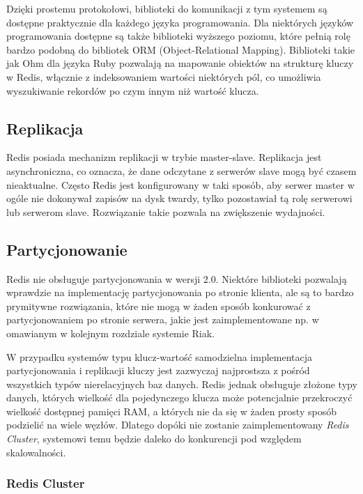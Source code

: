 Dzięki prostemu protokołowi, biblioteki do komunikacji z tym systemem są dostępne praktycznie dla każdego języka programowania.
Dla niektórych języków programowania dostępne są także biblioteki wyższego poziomu, które pełnią rolę bardzo podobną do bibliotek ORM (Object-Relational Mapping).
Biblioteki takie jak Ohm dla języka Ruby pozwalają na mapowanie obiektów na strukturę kluczy w Redis, włącznie z indeksowaniem wartości niektórych pól, co umożliwia wyszukiwanie rekordów po czym innym niż wartość klucza. 

\subsection*{Replikacja}

Redis posiada mechanizm replikacji w trybie master-slave.
Replikacja jest asynchroniczna, co oznacza, że dane odczytane z serwerów slave mogą być czasem nieaktualne.
Często Redis jest konfigurowany w taki sposób, aby serwer master w ogóle nie dokonywał zapisów na dysk twardy, tylko pozostawiał tą rolę serwerowi lub serwerom slave.
Rozwiązanie takie pozwala na zwiększenie wydajności.

\subsection*{Partycjonowanie}

Redis nie obsługuje partycjonowania w wersji 2.0.
Niektóre biblioteki pozwalają wprawdzie na implementację partycjonowania po stronie klienta, ale są to bardzo prymitywne rozwiązania, które nie mogą w żaden sposób konkurować z partycjonowaniem po stronie serwera, jakie jest zaimplementowane np. w omawianym w kolejnym rozdziale systemie Riak.

W przypadku systemów typu klucz-wartość samodzielna implementacja partycjonowania i replikacji kluczy jest zazwyczaj najprostsza z pośród wszystkich typów nierelacyjnych baz danych.
Redis jednak obsługuje złożone typy danych, których wielkość dla pojedynczego klucza może potencjalnie przekroczyć wielkość dostępnej pamięci RAM, a których nie da się w żaden prosty sposób podzielić na wiele węzłów.
Dlatego dopóki nie zostanie zaimplementowany \emph{Redis Cluster}, systemowi temu będzie daleko do konkurencji pod względem skalowalności.

\subsubsection*{Redis Cluster}


